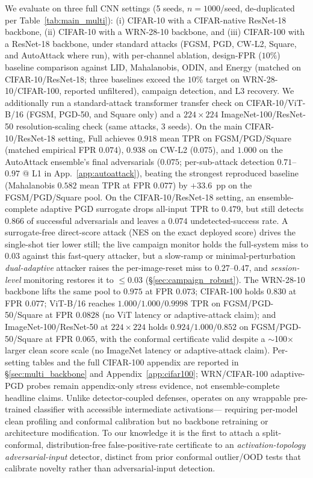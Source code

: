 We evaluate \prism on three full CNN settings (5 seeds,
$n{=}1000$/seed, de-duplicated per Table~\ref{tab:main_multi}):
(i) CIFAR-10 with a
CIFAR-native ResNet-18 backbone, (ii) CIFAR-10 with a WRN-28-10
backbone, and (iii) CIFAR-100 with a ResNet-18 backbone, under
standard attacks (FGSM, PGD, CW-L2, Square, and AutoAttack where run),
with per-channel
ablation, design-FPR ($10\%$) baseline comparison against LID,
Mahalanobis, ODIN, and Energy (matched on CIFAR-10/ResNet-18; three
baselines exceed the $10\%$ target on WRN-28-10/CIFAR-100, reported
unfiltered), campaign detection, and L3 recovery. We additionally run a
standard-attack transformer transfer check on CIFAR-10/ViT-B/16
(FGSM, PGD-50, and Square only) and a $224\times224$ ImageNet-100/ResNet-50
resolution-scaling check (same attacks, 3 seeds). On the main CIFAR-10/ResNet-18 setting,
\prism Full achieves
$0.918$ mean TPR on FGSM/PGD/Square (matched empirical FPR $0.074$),
$0.938$ on CW-L2 ($0.075$), and $1.000$ on the AutoAttack ensemble's
final adversarials ($0.075$; per-sub-attack detection $0.71$--$0.97$ @ L1
in App.~\ref{app:autoattack}), beating
the strongest reproduced baseline (Mahalanobis $0.582$ mean TPR at FPR
$0.077$) by $+33.6$~pp on the FGSM/PGD/Square pool. On the
CIFAR-10/ResNet-18 setting, an ensemble-complete adaptive PGD surrogate
drops all-input TPR to
$0.479$, but \prism still detects $0.866$ of successful adversarials
and leaves a $0.074$ undetected-success rate. A surrogate-free
direct-score attack (NES on the exact deployed score) drives the
single-shot tier lower still; the live \sacd campaign monitor holds the
full-system miss to $0.03$ against this fast-query attacker, but a
slow-ramp or minimal-perturbation \emph{dual-adaptive} attacker raises the
per-image-reset miss to $0.27$--$0.47$, and \emph{session-level} monitoring
restores it to ${\le}0.03$ (\S\ref{sec:campaign_robust}). The WRN-28-10
backbone lifts the same pool to $0.975$ at FPR $0.073$; CIFAR-100 holds
$0.830$ at FPR $0.077$; ViT-B/16 reaches
$1.000/1.000/0.9998$ TPR on FGSM/PGD-50/Square at FPR $0.0828$
(no ViT latency or adaptive-attack claim); and ImageNet-100/ResNet-50 at
$224\times224$ holds $0.924/1.000/0.852$ on FGSM/PGD-50/Square at FPR
$0.065$, with the conformal certificate valid despite a $\sim$100$\times$
larger clean score scale (no ImageNet latency or adaptive-attack claim). Per-setting tables and the
full CIFAR-100 appendix are reported in \S\ref{sec:multi_backbone} and
Appendix~\ref{app:cifar100}; WRN/CIFAR-100 adaptive-PGD probes remain
appendix-only stress evidence, not ensemble-complete headline claims.
Unlike detector-coupled defenses, \prism operates on any wrappable
pre-trained classifier with accessible intermediate activations---
requiring per-model clean profiling and conformal calibration but no
backbone retraining or architecture modification. To our knowledge it is
the first to attach a split-conformal, distribution-free false-positive-rate
certificate to an \emph{activation-topology adversarial-input} detector,
distinct from prior conformal outlier/OOD tests
\cite{kaur2022idecode,bates2023outliers} that calibrate novelty rather than
adversarial-input detection.
